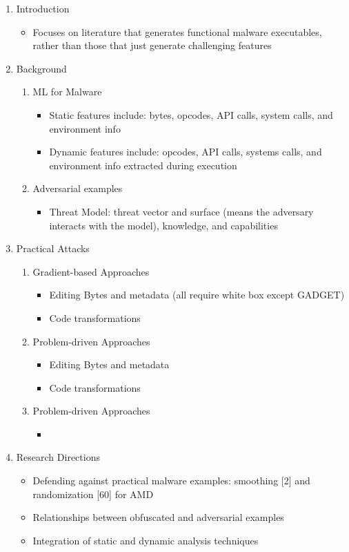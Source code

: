 \documentclass{article}
\begin{document}
\begin{enumerate}
	\item Introduction
	\begin{itemize}
		\item Focuses on literature that generates functional malware executables, rather than those that just generate challenging features
	\end{itemize}
	\item Background
	\begin{enumerate}
		\item ML for Malware
		\begin{itemize}
			\item Static features include: bytes, opcodes, API calls, system calls, and environment info
			\item Dynamic features include: opcodes, API calls, systems calls, and environment info extracted during execution
		\end{itemize}
		\item Adversarial examples
		\begin{itemize}
			\item Threat Model: threat vector and surface (means the adversary interacts with the model), knowledge, and capabilities
		\end{itemize}
	\end{enumerate}
	\item Practical Attacks
	\begin{enumerate}
		\item Gradient-based Approaches
		\begin{itemize}
			\item Editing Bytes and metadata (all require white box except GADGET)
			\item Code transformations
		\end{itemize}
		\item Problem-driven Approaches
		\begin{itemize}
			\item Editing Bytes and metadata
			\item Code transformations
		\end{itemize}
		\item Problem-driven Approaches
		\begin{itemize}
			\item 
		\end{itemize}
	\end{enumerate}
	\item Research Directions
	\begin{itemize}
		\item Defending against practical malware examples: smoothing [2] and randomization [60] for AMD 
		\item Relationships between obfuscated and adversarial examples
		\item Integration of static and dynamic analysis techniques
	\end{itemize}
\end{enumerate}
\pagebreak
\end{document}
